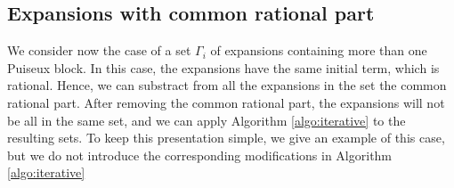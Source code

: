 \documentclass[a4paper,11pt]{amsart}%
\theoremstyle{definition}
\theoremstyle{plain}
\theoremstyle{remark}
\begin{document}

\subsection{Expansions with common rational part}

We consider now the case of a set $\Gamma_i$ of expansions containing more than one Puiseux block. In this case, the expansions have the same initial term, which is rational. Hence, we can substract from all the expansions in the set the common rational part. After removing the common rational part, the expansions will not be all in the same set, and we can apply Algorithm \ref{algo:iterative} to the resulting sets. To keep this presentation simple, we give an example of this case, but we do not introduce the corresponding modifications in Algorithm \ref{algo:iterative}
\end{document}
